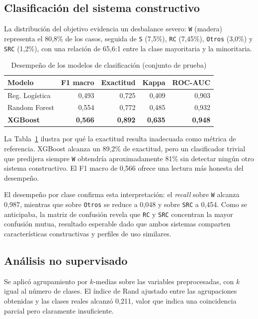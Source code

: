 \documentclass[conference]{IEEEtran}
\begin{document}
\subsection{Clasificación del sistema constructivo}

La distribución del objetivo evidencia un desbalance severo: \texttt{W} (madera) representa el
80,8\% de los casos, seguida de \texttt{S} (7,5\%), \texttt{RC} (7,45\%), \texttt{Otros}
(3,0\%) y \texttt{SRC} (1,2\%), con una relación de 65,6:1 entre la clase mayoritaria y la
minoritaria.

\begin{table}[htbp]
\caption{Desempeño de los modelos de clasificación (conjunto de prueba)}
\label{tab:clasificacion}
\centering
\begin{tabular}{lrrrr}
\toprule
\textbf{Modelo} & \textbf{F1 macro} & \textbf{Exactitud} & \textbf{Kappa} & \textbf{ROC-AUC} \\
\midrule
Reg. Logística   & 0,493 & 0,725 & 0,409 & 0,903 \\
Random Forest    & 0,554 & 0,772 & 0,485 & 0,932 \\
\textbf{XGBoost} & \textbf{0,566} & \textbf{0,892} & \textbf{0,635} & \textbf{0,948} \\
\bottomrule
\end{tabular}
\end{table}

La Tabla~\ref{tab:clasificacion} ilustra por qué la exactitud resulta inadecuada como métrica
de referencia. XGBoost alcanza un 89,2\% de exactitud, pero un clasificador trivial que
predijera siempre \texttt{W} obtendría aproximadamente 81\% sin detectar ningún otro sistema
constructivo. El F1 macro de 0,566 ofrece una lectura más honesta del desempeño.

El desempeño por clase confirma esta interpretación: el \textit{recall} sobre \texttt{W}
alcanza 0,987, mientras que sobre \texttt{Otros} se reduce a 0,048 y sobre \texttt{SRC} a
0,454. Como se anticipaba, la matriz de confusión revela que \texttt{RC} y \texttt{SRC}
concentran la mayor confusión mutua, resultado esperable dado que ambos sistemas comparten
características constructivas y perfiles de uso similares.

\subsection{Análisis no supervisado}

Se aplicó agrupamiento por $k$-medias sobre las variables preprocesadas, con $k$ igual al
número de clases. El índice de Rand ajustado entre las agrupaciones obtenidas y las clases
reales alcanzó 0,211, valor que indica una coincidencia parcial pero claramente insuficiente.
\end{document}

